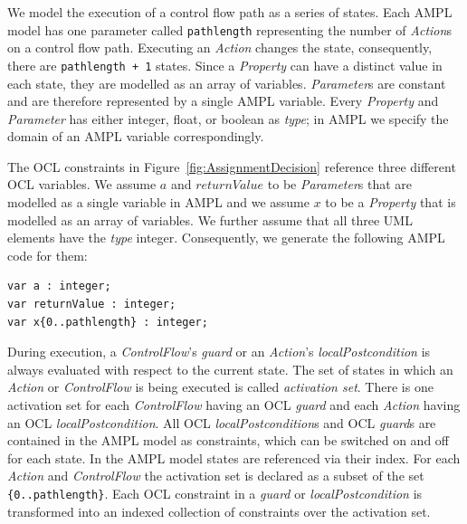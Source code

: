 \documentclass[runningheads,a4paper]{llncs}%
\newcommand{\UMLType}[1]{\textsf{\textit{#1}}} %
\newcommand{\UMLReference}[1]{\textsf{\textit{#1}}} %
\newcommand{\AMPLCode}[1]{\texttt{#1}}
\begin{document}
We model the execution of a control flow path as a series of states. Each AMPL
model has one parameter called \AMPLCode{pathlength} representing the number of
\UMLType{Action}s on a control flow path. Executing an \UMLType{Action} changes
the state, consequently, there are \AMPLCode{pathlength + 1} states. Since a
\UMLType{Property} can have a distinct value in each state, they are modelled as
an array of variables. \UMLType{Parameter}s are constant and are therefore
represented by a single AMPL variable. Every \UMLType{Property} and
\UMLType{Parameter} has either integer, float, or boolean as
\UMLReference{type}; in AMPL we specify the domain of an AMPL variable
correspondingly.

The OCL constraints in Figure~\ref{fig:AssignmentDecision} reference three
different OCL variables. We assume $a$ and $returnValue$ to be
\UMLType{Parameter}s that are modelled as a single variable in AMPL and we
assume $x$ to be a \UMLType{Property} that is modelled as an array of variables.
We further assume that all three UML elements have the \UMLReference{type}
integer. Consequently, we generate the following AMPL code for them: %
\begin{lstlisting}[basicstyle=\ttfamily,language=ampl]
var a : integer;
var returnValue : integer;
var x{0..pathlength} : integer;
\end{lstlisting}%

During execution, a \UMLType{ControlFlow}'s \UMLReference{guard} or an
\UMLType{Action}'s \UMLReference{localPostcondition} is always evaluated with
respect to the current state. The set of states in which an \UMLType{Action} or
\UMLType{ControlFlow} is being executed is called \emph{activation set}. There
is one activation set for each \UMLType{ControlFlow} having an OCL
\UMLReference{guard} and each \UMLType{Action} having an OCL
\UMLReference{localPostcondition}. All OCL \UMLReference{localPostcondition}s
and OCL \UMLReference{guard}s are contained in the AMPL model as constraints,
which can be switched on and off for each state. In the AMPL model states are
referenced via their index. For each \UMLType{Action} and \UMLType{ControlFlow}
the activation set is declared as a subset of the set
\AMPLCode{\{0..pathlength\}}. Each OCL constraint in a \UMLReference{guard} or
\UMLReference{localPostcondition} is transformed into an indexed collection of
constraints over the activation set.
\end{document}
